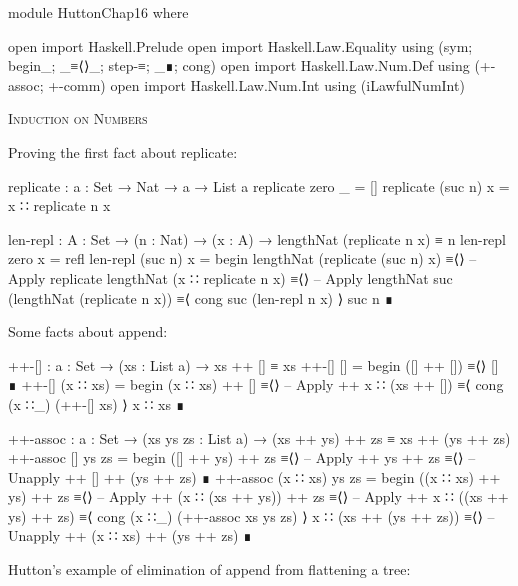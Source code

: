 \documentclass{article}
\begin{document}
\begin{code}
module HuttonChap16 where

open import Haskell.Prelude
open import Haskell.Law.Equality using (sym; begin_; _≡⟨⟩_; step-≡; _∎; cong)
open import Haskell.Law.Num.Def using (+-assoc; +-comm)
open import Haskell.Law.Num.Int using (iLawfulNumInt)
\end{code}

\noindent
\textsc{Induction on Numbers}

\noindent
Proving the first fact about replicate:

\begin{code}
replicate : {a : Set} → Nat → a → List a
replicate zero _ = []
replicate (suc n) x = x ∷ replicate n x
\end{code}
\begin{code}
len-repl : {A : Set} → (n : Nat) → (x : A) → lengthNat (replicate n x) ≡ n
len-repl zero x = refl
len-repl (suc n) x =
  begin
    lengthNat (replicate (suc n) x)
  ≡⟨⟩ -- Apply replicate
    lengthNat (x ∷ replicate n x)
  ≡⟨⟩ -- Apply lengthNat
    suc (lengthNat (replicate n x))
  ≡⟨ cong suc (len-repl n x) ⟩
    suc n
  ∎
\end{code}

\noindent
Some facts about append:

\begin{code}
++-[] : {a : Set} → (xs : List a) → xs ++ [] ≡ xs
++-[] [] = begin ([] ++ []) ≡⟨⟩ [] ∎
++-[] (x ∷ xs) =
    begin
      (x ∷ xs) ++ []
    ≡⟨⟩ -- Apply ++
      x ∷ (xs ++ [])
    ≡⟨ cong (x ∷_) (++-[] xs) ⟩
      x ∷ xs
    ∎
\end{code}
\begin{code}
++-assoc : {a : Set} → (xs ys zs : List a)
    → (xs ++ ys) ++ zs ≡ xs ++ (ys ++ zs)
++-assoc [] ys zs =
    begin
      ([] ++ ys) ++ zs
    ≡⟨⟩ -- Apply ++
      ys ++ zs
    ≡⟨⟩ -- Unapply ++
      [] ++ (ys ++ zs)
    ∎
++-assoc (x ∷ xs) ys zs =
    begin
      ((x ∷ xs) ++ ys) ++ zs
    ≡⟨⟩ -- Apply ++
      (x ∷ (xs ++ ys)) ++ zs
    ≡⟨⟩ -- Apply ++
      x ∷ ((xs ++ ys) ++ zs)
    ≡⟨ cong (x ∷_) (++-assoc xs ys zs) ⟩
      x ∷ (xs ++ (ys ++ zs))
    ≡⟨⟩ -- Unapply ++
      (x ∷ xs) ++ (ys ++ zs)
    ∎
\end{code}

\noindent Hutton's example of elimination of append from flattening a tree:
\end{document}
